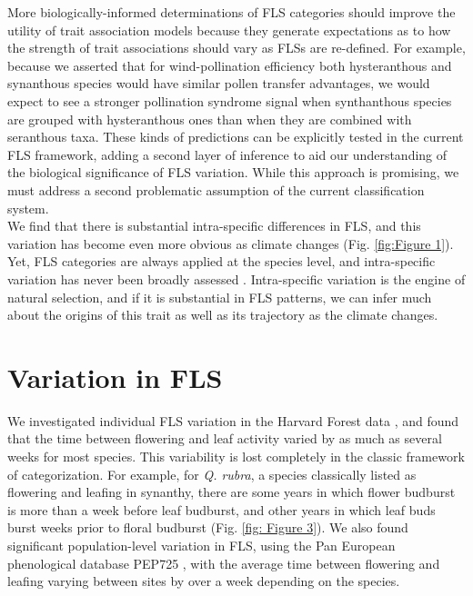 \documentclass[12pt]{article}
\begin{document}
\indent More biologically-informed determinations of FLS categories should improve the utility of trait association models because they generate expectations as to how the strength of trait associations should vary as FLSs are re-defined. For example, because we asserted that for wind-pollination efficiency both hysteranthous and synanthous species would have similar pollen transfer advantages, we would expect to see a stronger pollination syndrome signal when synthanthous species are grouped with hysteranthous ones than when they are combined with seranthous taxa. These kinds of predictions can be explicitly tested in the current FLS framework, adding a second layer of inference to aid our understanding of the biological significance of FLS variation. While this approach is promising, we must address a second problematic assumption of the current classification system. \\ %

\indent We find that there is substantial intra-specific differences in FLS, and this variation has become even more obvious as climate changes (Fig. \ref{fig:Figure 1}).%
Yet, FLS categories are always applied at the species level, and intra-specific variation has never been broadly assessed \citep{Gougherty2018}. Intra-specific variation is the engine of natural selection, and if it is substantial in FLS patterns, we can infer much about the origins of this trait as well as its trajectory as the climate changes. 

\section*{Variation in FLS}
 \indent\indent We investigated individual FLS variation in the Harvard Forest data \citep{OKeefe2015}, and found that the time between flowering and leaf activity varied by as much as several weeks for most species. This variability is lost completely in the classic framework of categorization. For example, for  \textit{Q. rubra}, a species classically listed as flowering and leafing in synanthy, there are some years in which flower budburst is more than a week before leaf budburst, and other years in which leaf buds burst weeks prior to floral budburst (Fig. \ref{fig: Figure 3}). We also found significant population-level variation in FLS, using the Pan European phenological database PEP725 \citep{PEP725}, with the average time between flowering and leafing varying between sites by over a week depending on the species.\\
 
\end{document}

